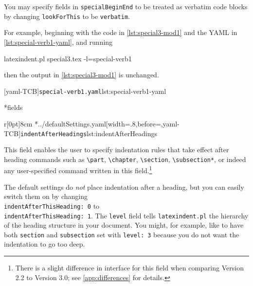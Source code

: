 	You may%
	 specify fields in
	\texttt{specialBeginEnd} to be treated as verbatim code blocks by changing
	\texttt{lookForThis} to be \texttt{verbatim}.

	For example, beginning with the code in \cref{lst:special3-mod1} and the YAML  in
	\cref{lst:special-verb1-yaml}, and running
	\begin{commandshell}
latexindent.pl special3.tex -l=special-verb1
    \end{commandshell}
	then the output in \cref{lst:special3-mod1} is unchanged.

        \begin{cmhtcbraster}
		[yaml-TCB]{\texttt{special-verb1.yaml}}{lst:special-verb1-yaml}
        \end{cmhtcbraster}

*{fields}
	\begin{wrapfigure}[17]{r}[0pt]{8cm}
		\cmhlistingsfromfile[style=indentAfterHeadings]*{../defaultSettings.yaml}[width=.8\linewidth,before=\centering,yaml-TCB]{\texttt{indentAfterHeadings}}{lst:indentAfterHeadings}
	\end{wrapfigure}
	This field enables the user to specify indentation rules that take effect after heading
	commands such as \lstinline!\part!, \lstinline!\chapter!,
	\lstinline!\section!, \lstinline!\subsection*!, or indeed any user-specified command
	written in this field.\footnote{There is a slight
		difference in interface for this field when comparing Version 2.2 to Version 3.0; see \vref{app:differences} for details.}

	The default settings do \emph{not} place indentation after a heading, but
	you can easily switch them on by changing \\ \texttt{indentAfterThisHeading: 0} to \\
	\texttt{indentAfterThisHeading: 1}. The \texttt{level} field tells \texttt{latexindent.pl}
	the hierarchy of the heading structure in your document. You might, for example, like to
	have both \texttt{section} and \texttt{subsection} set with
	\texttt{level: 3} because you do not want the indentation to go too deep.

